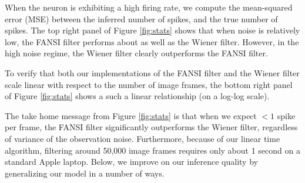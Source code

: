 When the neuron is exhibiting a high firing rate, we compute the mean-squared error (MSE) between the inferred number of spikes, and the true number of spikes.  The top right panel of Figure \ref{fig:stats} shows that when noise is relatively low, the FANSI filter performs about as well as the Wiener filter.  However, in the high noise regime, the Wiener filter clearly outperforms the FANSI filter.  

To verify that both our implementations of the FANSI filter and the Wiener filter scale linear with respect to the number of image frames, the bottom right panel of Figure \ref{fig:stats} shows a such a linear relationship (on a log-log scale).  

The take home message from Figure \ref{fig:stats} is that when we expect $<1$ spike per frame, the FANSI filter significantly outperforms the Wiener filter, regardless of variance of the observation noise.  Furthermore, because of our linear time algorithm, filtering around 50,000 image frames requires only about 1 second on a standard Apple laptop.  Below, we improve on our inference quality by generalizing our model in a number of ways.




